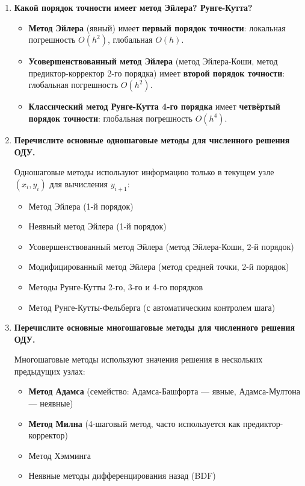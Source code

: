 \documentclass[a4paper,12pt]{article}
\begin{document}
\begin{enumerate}
\item \textbf{Какой порядок точности имеет метод Эйлера? Рунге-Кутта?}

\begin{itemize}
    \item \textbf{Метод Эйлера} (явный) имеет \textbf{первый порядок точности}: локальная погрешность \( O(h^2) \), глобальная \( O(h) \).
    \item \textbf{Усовершенствованный метод Эйлера} (метод Эйлера-Коши, метод предиктор-корректор 2-го порядка) имеет \textbf{второй порядок точности}: глобальная погрешность \( O(h^2) \).
    \item \textbf{Классический метод Рунге-Кутта 4-го порядка} имеет \textbf{четвёртый порядок точности}: глобальная погрешность \( O(h^4) \).
\end{itemize}

\item \textbf{Перечислите основные одношаговые методы для численного решения ОДУ.}

Одношаговые методы используют информацию только в текущем узле \( (x_i, y_i) \) для вычисления \( y_{i+1} \):
\begin{itemize}
    \item Метод Эйлера (1-й порядок)
    \item Неявный метод Эйлера (1-й порядок)
    \item Усовершенствованный метод Эйлера (метод Эйлера-Коши, 2-й порядок)
    \item Модифицированный метод Эйлера (метод средней точки, 2-й порядок)
    \item Методы Рунге-Кутты 2-го, 3-го и 4-го порядков
    \item Метод Рунге-Кутты-Фельберга (с автоматическим контролем шага)
\end{itemize}

\item \textbf{Перечислите основные многошаговые методы для численного решения ОДУ.}

Многошаговые методы используют значения решения в нескольких предыдущих узлах:
\begin{itemize}
    \item \textbf{Метод Адамса} (семейство: Адамса-Башфорта — явные, Адамса-Мултона — неявные)
    \item \textbf{Метод Милна} (4-шаговый метод, часто используется как предиктор-корректор)
    \item Метод Хэмминга
    \item Неявные методы дифференцирования назад (BDF)
\end{itemize}


\end{enumerate}
\end{document}
